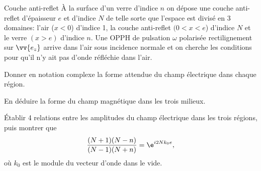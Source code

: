 
\begin{exo}[PC][2][TD]{Couche anti-reflet}
À la surface d'un verre d'indice $n$ on dépose une couche anti-reflet d'épaisseur $e$ et d'indice $N$ de telle sorte que l'espace est divisé en 3 domaines: l'air ($x<0$) d'indice 1, la couche anti-reflet $(0<x<e$) d'indice $N$ et le verre $(x>e)$ d'indice $n$. Une OPPH de pulsation $\omega$ polarisée rectilignement sur $\vv{e_z}$ arrive dans l'air sous incidence normale et on cherche les conditions pour qu'il n'y ait pas d'onde réfléchie dans l'air.
 \begin{quest}
\item Donner en notation complexe la forme attendue du champ électrique dans chaque région.
\item En déduire la forme du champ magnétique dans les trois milieux.
\item Établir 4 relations entre les amplitudes du champ électrique dans les trois régions, puis montrer que
\begin{equation*}
\frac{(N+1)(N-n)}{(N-1)(N+n)}=\e^{i2Nk_{0}e},
\end{equation*}
où $k_{0}$ est le module du vecteur d'onde dans le vide.
\end{quest}
\end{exo}
